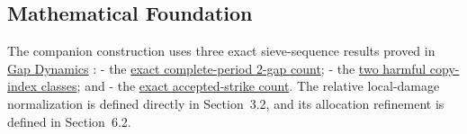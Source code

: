 \subsection{Mathematical Foundation}
The companion construction uses three exact sieve-sequence results proved in \href{https://doi.org/10.5281/zenodo.22955786}{Gap Dynamics} \cite{gapdynamics2026}:
- the \href{https://github.com/thiagomata/prime-numbers/blob/master/articles/chapter6/gap-dynamics.md#52-exact-non-recursive-global-count}{exact complete-period 2-gap count}; - the \href{https://github.com/thiagomata/prime-numbers/blob/master/articles/chapter6/gap-dynamics.md#61-one-new-prime-forbids-two-copy-classes}{two harmful copy-index classes}; and - the \href{https://github.com/thiagomata/prime-numbers/blob/master/articles/chapter6/gap-dynamics.md#91-exact-accepted-strikes}{exact accepted-strike count}.
The relative local-damage normalization is defined directly in Section~3.2, and its allocation refinement is defined in Section~6.2.
